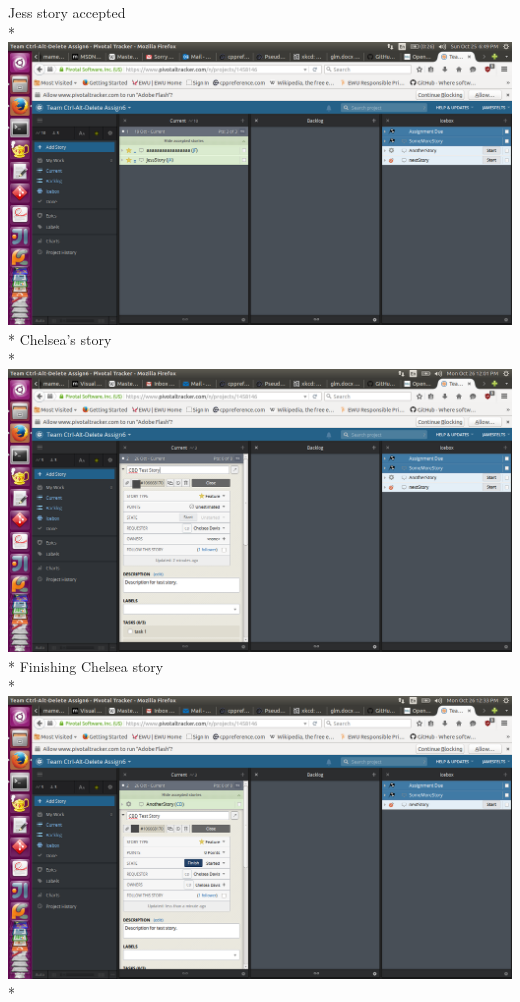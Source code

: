 \documentclass{article}
\begin{document}
Jess story accepted\\*
\includegraphics[scale=.3]{Screenshot from 2015-10-25 18-49-38.png}\\*
\newpage Chelsea's story\\*
\includegraphics[scale=.3]{Screenshot from 2015-10-26 12-01-24.png}\\*
Finishing Chelsea story\\*
\includegraphics[scale=.3]{Screenshot from 2015-10-26 12-33-56.png}\\*
\end{document}
